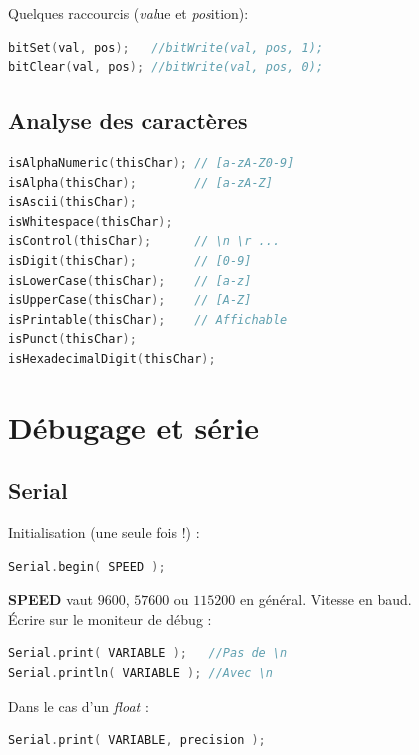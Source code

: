             \bmar
                Quelques raccourcis (\textit{val}ue et \textit{pos}ition):
            \emar

            \begin{lstlisting}[language=C]
bitSet(val, pos);   //bitWrite(val, pos, 1);
bitClear(val, pos); //bitWrite(val, pos, 0);
            \end{lstlisting}


        \subsection{Analyse des caractères}
            \begin{lstlisting}[language=C]
isAlphaNumeric(thisChar); // [a-zA-Z0-9]
isAlpha(thisChar);        // [a-zA-Z]
isAscii(thisChar);
isWhitespace(thisChar);
isControl(thisChar);      // \n \r ...
isDigit(thisChar);        // [0-9]
isLowerCase(thisChar);    // [a-z]
isUpperCase(thisChar);    // [A-Z]
isPrintable(thisChar);    // Affichable
isPunct(thisChar);
isHexadecimalDigit(thisChar);
            \end{lstlisting}

    \section{Débugage et série}
        \subsection{Serial}
            \bmar
                Initialisation (une seule fois !) :
            \emar

            \begin{lstlisting}[language=C]
Serial.begin( SPEED );
            \end{lstlisting}
            \bmar
                \textbf{SPEED} vaut $9600$, $57600$ ou $115200$ en général. Vitesse en baud.\\
                Écrire sur le moniteur de débug :
            \emar

            \begin{lstlisting}[language=C]
Serial.print( VARIABLE );   //Pas de \n
Serial.println( VARIABLE ); //Avec \n
            \end{lstlisting}

            \bmar
                Dans le cas d'un \textit{float} :
            \emar

            \begin{lstlisting}[language=C]
Serial.print( VARIABLE, precision );
            \end{lstlisting}


